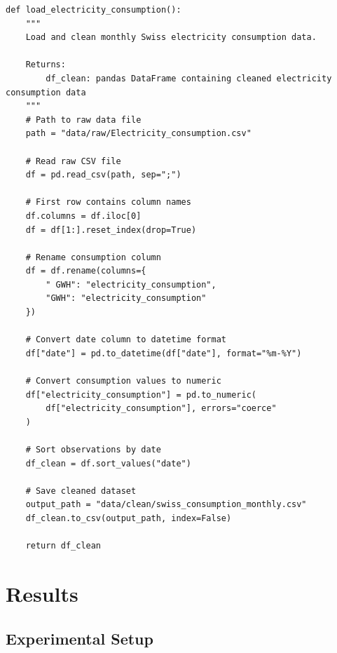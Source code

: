 \documentclass[11pt,a4paper]{article}
\begin{document}
\begin{lstlisting}[caption={Example data loading and cleaning function}]
def load_electricity_consumption():
    """
    Load and clean monthly Swiss electricity consumption data.
    
    Returns:
        df_clean: pandas DataFrame containing cleaned electricity consumption data
    """
    # Path to raw data file
    path = "data/raw/Electricity_consumption.csv"

    # Read raw CSV file
    df = pd.read_csv(path, sep=";")

    # First row contains column names
    df.columns = df.iloc[0]
    df = df[1:].reset_index(drop=True)

    # Rename consumption column
    df = df.rename(columns={
        " GWH": "electricity_consumption",
        "GWH": "electricity_consumption"
    })

    # Convert date column to datetime format
    df["date"] = pd.to_datetime(df["date"], format="%m-%Y")

    # Convert consumption values to numeric
    df["electricity_consumption"] = pd.to_numeric(
        df["electricity_consumption"], errors="coerce"
    )

    # Sort observations by date
    df_clean = df.sort_values("date")

    # Save cleaned dataset
    output_path = "data/clean/swiss_consumption_monthly.csv"
    df_clean.to_csv(output_path, index=False)

    return df_clean
\end{lstlisting}

\section{Results}
\label{sec:results}

\subsection{Experimental Setup}
\end{document}
